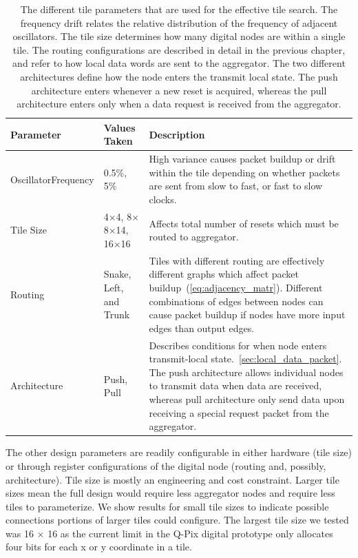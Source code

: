 \begin{table}
\begin{center}
\begin{tabular}{|| p{30mm} | p{30mm} | p{90mm} ||}
 \hline
 Parameter & Values Taken & Description \\ [0.5ex]
 \hline\hline
  Oscillator\newline Frequency & 0.5\%, 5\% & High variance causes packet buildup or drift within the tile depending on whether packets are sent from slow to fast, or fast to slow clocks. \\
 \hline
  Tile Size & 4$\times$4, 8$\times$8\newline 10$\times$14, 16$\times$16 & Affects total number of resets which must be routed to aggregator.\\
 \hline
  Routing & Snake, Left, and Trunk & Tiles with different routing are effectively different graphs which affect packet buildup~(\ref{eq:adjacency_matr}). Different combinations of edges between nodes can cause packet buildup if nodes have more input edges than output edges.  \\
 \hline
  Architecture & Push, Pull & Describes conditions for when node enters transmit-local state.~\ref{sec:local_data_packet}. The push architecture allows individual nodes to transmit data when data are received, whereas pull architecture only send data upon receiving a special request packet from the aggregator.  \\
 \hline
\end{tabular}
\caption{The different tile parameters that are used for the effective tile search.
  The frequency drift relates the relative distribution of the frequency of adjacent oscillators.
  The tile size determines how many digital nodes are within a single tile.
  The routing configurations are described in detail in the previous chapter, and refer to how local data words are sent to the aggregator.
  The two different architectures define how the node enters the transmit local state.
  The push architecture enters whenever a new reset is acquired, whereas the pull architecture enters only when a data request is received from the aggregator.}
\label{table:tile_params}
\end{center}
\end{table}

The other design parameters are readily configurable in either hardware (tile size) or through register configurations of the digital node (routing and, possibly, architecture).
Tile size is mostly an engineering and cost constraint.
Larger tile sizes mean the full design would require less aggregator nodes and require less tiles to parameterize.
We show results for small tile sizes to indicate possible connections portions of larger tiles could configure.
The largest tile size we tested was 16 $\times$ 16 as the current limit in the Q-Pix digital prototype only allocates four bits for each x or y coordinate in a tile.


